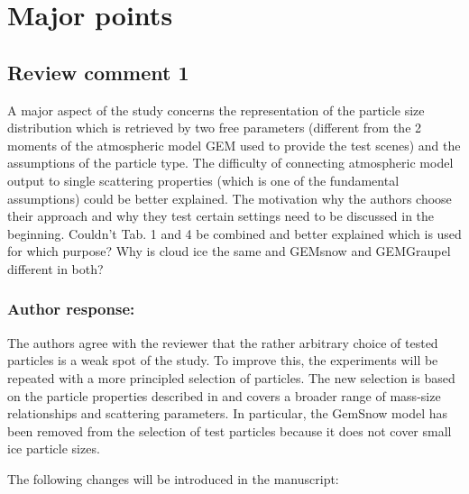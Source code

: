 \documentclass[11pt]{scrartcl}
\author{simon}
\date{\today}
\title{}
\begin{document}
\setlength{\parindent}{0cm}

\section{Major points}

\subsection*{Review comment 1}

A major aspect of the study concerns the representation of the particle size
distribution which is retrieved by two free parameters (different from the 2
moments of the atmospheric model GEM used to provide the test scenes) and the
assumptions of the particle type. The difficulty of connecting atmospheric model
output to single scattering properties (which is one of the fundamental
assumptions) could be better explained. The motivation why the authors choose
their approach and why they test certain settings need to be discussed in the
beginning. Couldn’t Tab. 1 and 4 be combined and better explained which is used
for which purpose? Why is cloud ice the same and GEMsnow and GEMGraupel different
in both?

\subsubsection*{Author response:}

The authors agree with the reviewer that the rather arbitrary choice of tested
particles is a weak spot of the study. To improve this, the experiments will be
repeated with a more principled selection of particles. The new selection is
based on the particle properties described in \citet{ekelund19} and covers a
broader range of mass-size relationships and scattering parameters. In
particular, the GemSnow model has been removed from the selection of test
particles because it does not cover small ice particle sizes.

The following changes will be introduced in the manuscript:
\end{document}
